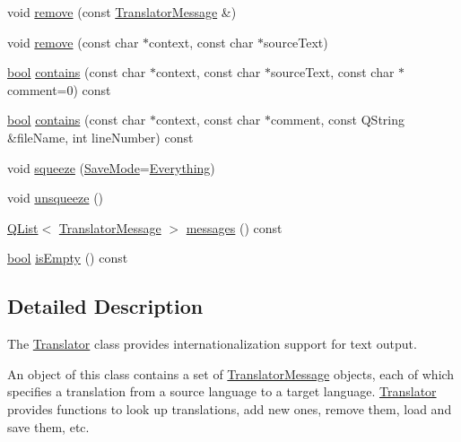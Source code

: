 \begin{DoxyCompactItemize}
\item 
void \hyperlink{classTranslator_abeaed252a6d759954efa4de668bea2ad}{remove} (const \hyperlink{classTranslatorMessage}{Translator\+Message} \&)
\item 
void \hyperlink{classTranslator_a5352ba6a8c6ebae1d1dcac76ffe38c41}{remove} (const char $\ast$context, const char $\ast$source\+Text)
\item 
\hyperlink{compiler_8h_abb452686968e48b67397da5f97445f5b}{bool} \hyperlink{classTranslator_a64287b3ed668ce3620548d2e8d5d0d1d}{contains} (const char $\ast$context, const char $\ast$source\+Text, const char $\ast$comment=0) const 
\item 
\hyperlink{compiler_8h_abb452686968e48b67397da5f97445f5b}{bool} \hyperlink{classTranslator_ae2382d9461e04937c1cb3bdc324c602e}{contains} (const char $\ast$context, const char $\ast$comment, const Q\+String \&file\+Name, int line\+Number) const 
\item 
void \hyperlink{classTranslator_aa8595b69976c3680bf18613ae8510482}{squeeze} (\hyperlink{classTranslator_aefe656fdfa14952a99d6d25e61749a99}{Save\+Mode}=\hyperlink{classTranslator_aefe656fdfa14952a99d6d25e61749a99a3847cfbd6836d9a65ac73fc641bb3085}{Everything})
\item 
void \hyperlink{classTranslator_a7f58f925b0955973444c1e60eb2e8ae7}{unsqueeze} ()
\item 
\hyperlink{classQList}{Q\+List}$<$ \hyperlink{classTranslatorMessage}{Translator\+Message} $>$ \hyperlink{classTranslator_ad1abe7e46be002819ac15e57c89b8032}{messages} () const 
\item 
\hyperlink{compiler_8h_abb452686968e48b67397da5f97445f5b}{bool} \hyperlink{classTranslator_a41bbb75a0e7bbcfd684efeee60b866c8}{is\+Empty} () const 
\end{DoxyCompactItemize}


\subsection{Detailed Description}
The \hyperlink{classTranslator}{Translator} class provides internationalization support for text output. 

An object of this class contains a set of \hyperlink{classTranslatorMessage}{Translator\+Message} objects, each of which specifies a translation from a source language to a target language. \hyperlink{classTranslator}{Translator} provides functions to look up translations, add new ones, remove them, load and save them, etc.

